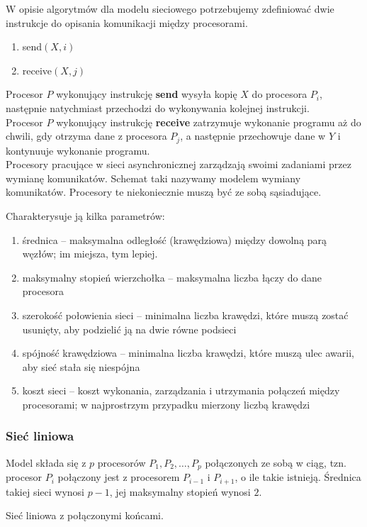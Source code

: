 W opisie algorytmów dla modelu sieciowego potrzebujemy zdefiniować dwie instrukcje do opisania komunikacji między procesorami.
\begin{enumerate}
 \item send\((X,i)\)
 \item receive\((X,j)\)
\end{enumerate}

Procesor \(P\) wykonujący instrukcję \textbf{send} wysyła kopię \(X\) do procesora \(P_i\), następnie natychmiast przechodzi do wykonywania kolejnej instrukcji.\\
Procesor \(P\) wykonujący instrukcję \textbf{receive} zatrzymuje wykonanie programu aż do chwili, gdy otrzyma dane z procesora \(P_j\), a następnie przechowuje dane w \(Y\) i kontynuuje wykonanie programu.\\



Procesory pracujące w sieci asynchronicznej zarządzają swoimi zadaniami przez wymianę komunikatów. Schemat taki nazywamy modelem wymiany komunikatów. Procesory te niekoniecznie muszą być ze sobą sąsiadujące. 


Charakterysuje ją kilka parametrów:

\begin{enumerate}
 \item średnica – maksymalna odległość (krawędziowa) między dowolną parą węzłów; im miejsza, tym lepiej.
 \item maksymalny stopień wierzchołka – maksymalna liczba łączy do dane procesora
 \item szerokość połowienia sieci – minimalna liczba krawędzi, które muszą zostać usunięty, aby podzielić ją na dwie równe podsieci
 \item spójność krawędziowa – minimalna liczba krawędzi, które muszą ulec awarii, aby sieć stała się niespójna
 \item koszt sieci – koszt wykonania, zarządzania i utrzymania połączeń między procesorami; w najprostrzym przypadku mierzony liczbą krawędzi
\end{enumerate}


\subsubsection{Sieć liniowa}
\begin{definicja}
Model składa się z \(p\) procesorów \(P_1, P_2, \dots, P_p\) połączonych ze sobą w ciąg, tzn. procesor \(P_i\) połączony jest z procesorem \(P_{i-1}\) i \(P_{i+1}\), o ile takie istnieją. Średnica takiej sieci wynosi \(p-1\), jej maksymalny stopień wynosi \(2\).\\
\end{definicja}
\begin{definicja}[Torus]
Sieć liniowa z połączonymi końcami.
\end{definicja}


